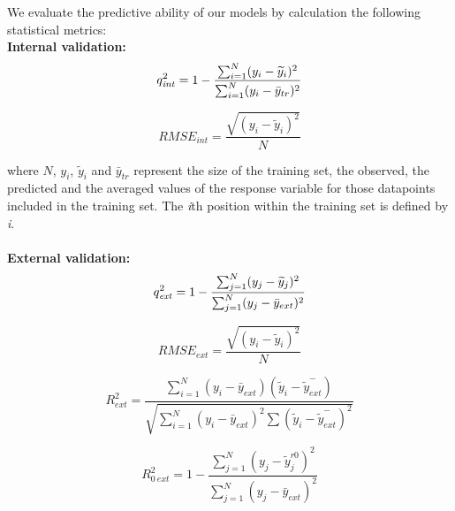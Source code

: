 \documentclass[twoside,a4wide,12pt]{article}\usepackage[]{graphicx}\usepackage[]{color}
\begin{document}
We evaluate the predictive ability of our models by calculation the following statistical metrics:\\

{\bf Internal validation:}
\\
\begin{equation}
q_{{\it int}}^{2} = 1 - \frac {\sum_{i=1}^{N} (y_{i} - \widetilde{y}_{i})^{2}} {\sum_{i=1}^{N} (y_{i} - \bar{y}_{tr})^{2}}
\end{equation}

\begin{equation}
RMSE_{int} = \frac {\sqrt {(y_i - \widetilde{y}_i)^{2}}} {N}
\end{equation}

where $N$, $y_i$, $\widetilde{y}_i$ and $\bar{y}_{tr}$ represent the size of the training set, the observed, the predicted and the averaged values of the response variable for those datapoints included in the training set. The {\it i}th position within the training set is defined by {\it i}.  
\\
\\
{\bf External validation:}
\\

\begin{equation}
q_{{\it ext}}^{2} = 1 - \frac {\sum_{j=1}^{N} (y_j-\widetilde{y}_j)^{2}}  {\sum_{j=1}^{N} (y_j - \bar{y}_{ext})^{2}}
\end{equation}

\begin{equation}
RMSE_{ext} = \frac {\sqrt {(y_i - \widetilde{y}_i)^{2}}} {N} 
\end{equation}

\begin{equation}
R_{ext}^{2} = \frac {{\sum_{i=1}^{N} (y_{i} - \bar{y}_{ext})}  (\widetilde{y}_{i} - \overset{-}{\widetilde{y}_{ext}})} 
{\sqrt{\sum_{i=1}^{N} (y_{i} - \bar{y}_{ext})^{2} \sum{ (\widetilde{y}_{i} - \overset{-}{\widetilde{y}_{ext}})^{2}}}}
\end{equation}

\begin{equation}
R_{0\:ext}^2 = 1 - \frac {\sum_{j=1}^{N} (y_{j} - \widetilde{y}_{j}^{ r0})^{2}} {\sum_{j=1}^{N} (y_{j} - \bar{y}_{ext})^{2}} 
\end{equation}
\end{document}
